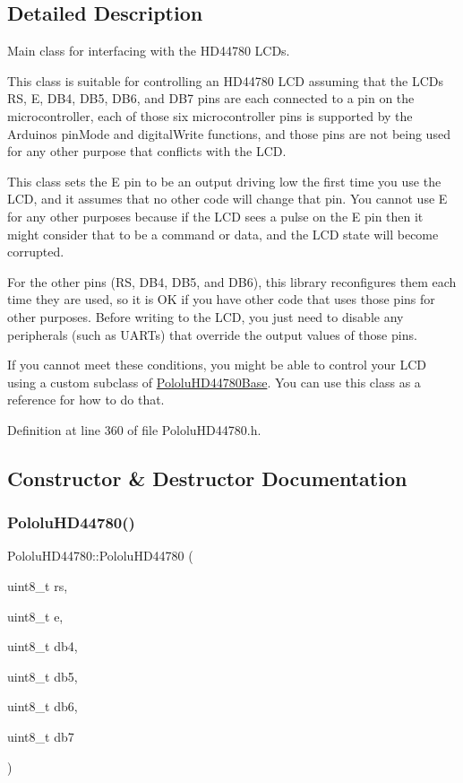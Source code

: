 \subsection{Detailed Description}
Main class for interfacing with the H\+D44780 L\+C\+Ds. 

This class is suitable for controlling an H\+D44780 L\+CD assuming that the L\+CD\textquotesingle{}s RS, E, D\+B4, D\+B5, D\+B6, and D\+B7 pins are each connected to a pin on the microcontroller, each of those six microcontroller pins is supported by the Arduino\textquotesingle{}s {\ttfamily pin\+Mode} and {\ttfamily digital\+Write} functions, and those pins are not being used for any other purpose that conflicts with the L\+CD.

This class sets the E pin to be an output driving low the first time you use the L\+CD, and it assumes that no other code will change that pin. You cannot use E for any other purposes because if the L\+CD sees a pulse on the E pin then it might consider that to be a command or data, and the L\+CD state will become corrupted.

For the other pins (RS, D\+B4, D\+B5, and D\+B6), this library reconfigures them each time they are used, so it is OK if you have other code that uses those pins for other purposes. Before writing to the L\+CD, you just need to disable any peripherals (such as U\+A\+R\+Ts) that override the output values of those pins.

If you cannot meet these conditions, you might be able to control your L\+CD using a custom subclass of \hyperlink{class_pololu_h_d44780_base}{Pololu\+H\+D44780\+Base}. You can use this class as a reference for how to do that. 

Definition at line 360 of file Pololu\+H\+D44780.\+h.



\subsection{Constructor \& Destructor Documentation}
\mbox{\label{class_pololu_h_d44780_aa435495f74686245db4f89a4d434b3ee}} 
\subsubsection{\texorpdfstring{Pololu\+H\+D44780()}{PololuHD44780()}}
{\footnotesize\ttfamily Pololu\+H\+D44780\+::\+Pololu\+H\+D44780 (\begin{DoxyParamCaption}\item[{uint8\+\_\+t}]{rs,  }\item[{uint8\+\_\+t}]{e,  }\item[{uint8\+\_\+t}]{db4,  }\item[{uint8\+\_\+t}]{db5,  }\item[{uint8\+\_\+t}]{db6,  }\item[{uint8\+\_\+t}]{db7 }\end{DoxyParamCaption})\hspace{0.3cm}{\ttfamily [inline]}}

